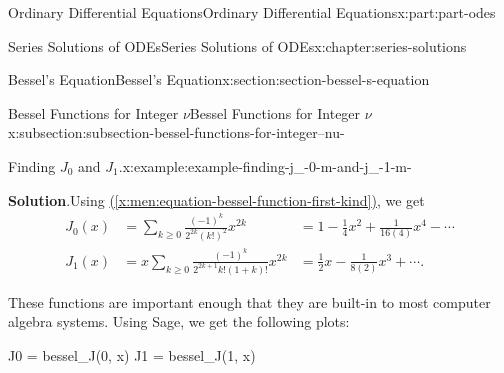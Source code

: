 \documentclass[twoside,10pt,]{book}
\newcommand{\blocktitlefont}{\relax}
\newcommand{\xreffont}{\relax}
\numberwithin{equation}{part}
\newcommand{\amp}{&}
\begin{document}
\begin{partptx}{Ordinary Differential Equations}{}{Ordinary Differential Equations}{}{}{x:part:part-odes}
\begin{chapterptx}{Series Solutions of ODEs}{}{Series Solutions of ODEs}{}{}{x:chapter:series-solutions}
\begin{sectionptx}{Bessel's Equation}{}{Bessel's Equation}{}{}{x:section:section-bessel-s-equation}
\begin{subsectionptx}{Bessel Functions for Integer \(\nu\)}{}{Bessel Functions for Integer \(\nu\)}{}{}{x:subsection:subsection-bessel-functions-for-integer--nu-}
\begin{example}{Finding \(J_{0}\) and \(J_{1}\).}{x:example:example-finding-j_-0-m-and-j_-1-m-}
\par\smallskip%
\noindent\textbf{\blocktitlefont Solution}.\hypertarget{g:solution:idp105548817428896}{}\quad{}Using \hyperref[x:men:equation-bessel-function-first-kind]{({\xreffont\ref{x:men:equation-bessel-function-first-kind}})}, we get%
\begin{align*}
J_{0}(x) \amp = \sum_{k\geq0}\frac{(-1)^{k}}{2^{2k}(k!)^{2}}x^{2k} \amp= 1 - \frac{1}{4}x^{2} + \frac{1}{16(4)}x^{4} - \cdots\\
J_{1}(x) \amp = x\sum_{k\geq0}\frac{(-1)^{k}}{2^{2k + 1}k!(1 + k)!}x^{2k} \amp= \frac{1}{2}x - \frac{1}{8(2)}x^{3} + \cdots\text{.}
\end{align*}
%
\end{example}
These functions are important enough that they are built-in to most computer algebra systems. Using Sage, we get the following plots:%
\begin{sageinput}
J0 = bessel_J(0, x)
J1 = bessel_J(1, x)


\end{sageinput}
\end{subsectionptx}
\end{sectionptx}
\end{chapterptx}
\end{partptx}
\end{document}
